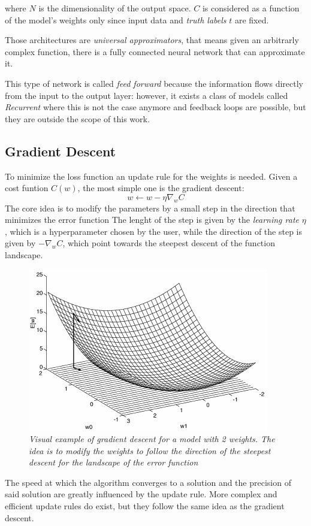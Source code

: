 \documentclass[12pt,a4paper]{report}
\begin{document}
where $N$ is the dimensionality of the output space. $C$ is considered as a function of the model's weights only since input data and {\it truth labels} $t$ are fixed.

Those architectures are {\it universal approximators}, that means given an arbitrarly complex function, there is a fully connected neural network that can approximate it.

This type of network is called {\it feed forward} because the information flows directly from the input to the output layer: however, it exists a class of models called {\it Recurrent} where this is not the case anymore and feedback loops are possible, but they are outside the scope of this work. 

\subsection*{Gradient Descent}

To minimize the loss function an update rule for the weights is needed. 
Given a cost funtion $C(w)$, the most simple one is the gradient descent:
\begin{equation}
 w \leftarrow w - \eta \nabla_w C
\end{equation}
The core idea is to modify the parameters by a small step in the direction that minimizes the error function
The lenght of the step is given by the {\it learning rate} $\eta$, which is a hyperparameter chosen by the user, while the direction of the step is given by $-\nabla_w C$, which point towards the steepest descent of the function landscape.

\begin{figure}[h]
 \centering
 \includegraphics[scale=0.8]{./images/sgd.png}
 \caption{\it Visual example of gradient descent for a model with 2 weights. The idea is to modify the weights to follow the direction of the steepest descent for the landscape of the error function}
 \label{fig:gd}
\end{figure}
The speed at which the algorithm converges to a solution and the precision of said solution are greatly influenced by the update rule. More complex and efficient update rules do exist, but they follow the same idea as the gradient descent.
\end{document}
